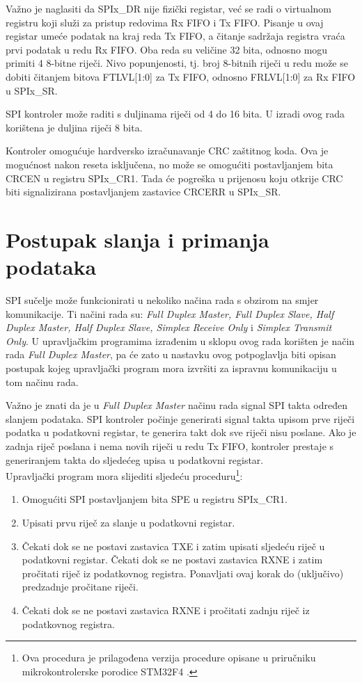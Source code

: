 		Važno je naglasiti da SPIx\_DR nije fizički registar, već se radi o virtualnom registru koji služi za pristup redovima Rx FIFO i Tx FIFO. Pisanje u ovaj registar umeće podatak na kraj reda Tx FIFO, a čitanje sadržaja registra vraća prvi podatak u redu Rx FIFO. Oba reda su veličine 32 bita, odnosno mogu primiti 4 8-bitne riječi. Nivo popunjenosti, tj. broj 8-bitnih riječi u redu može se dobiti čitanjem bitova FTLVL[1:0] za Tx FIFO, odnosno FRLVL[1:0] za Rx FIFO u SPIx\_SR. 
		
		SPI kontroler može raditi s duljinama riječi od 4 do 16 bita. U izradi ovog rada korištena je duljina riječi 8 bita.
		
		Kontroler omogućuje hardversko izračunavanje CRC zaštitnog koda. Ova je mogućnost nakon reseta isključena, no može se omogućiti postavljanjem bita CRCEN u registru SPIx\_CR1. Tada će pogreška u prijenosu koju otkrije CRC biti signalizirana postavljanjem zastavice CRCERR u SPIx\_SR.
		
	\section{Postupak slanja i primanja podataka}
		
		SPI sučelje može funkcionirati u nekoliko načina rada s obzirom na smjer komunikacije. Ti načini rada su: \textit{Full Duplex Master, Full Duplex Slave, Half Duplex Master, Half Duplex Slave, Simplex Receive Only} i \textit{Simplex Transmit Only}. U upravljačkim programima izrađenim u sklopu ovog rada korišten je način rada \textit{Full Duplex Master}, pa će zato u nastavku ovog potpoglavlja biti opisan postupak kojeg upravljački program mora izvršiti za ispravnu komunikaciju u tom načinu rada.
		
		Važno je znati da je u \textit{Full Duplex Master} načinu rada signal SPI takta određen slanjem podataka. SPI kontroler počinje generirati signal takta upisom prve riječi podatka u podatkovni registar, te generira takt dok sve riječi nisu poslane. Ako je zadnja riječ poslana i nema novih riječi u redu Tx FIFO, kontroler prestaje s generiranjem takta do sljedećeg upisa u podatkovni registar. \\
		
		Upravljački program mora slijediti sljedeću proceduru\footnote{Ova procedura je prilagođena verzija procedure opisane u priručniku mikrokontrolerske porodice STM32F4 \cite[str.~887]{stm32f4_manual}.}:
		\begin{enumerate}
			\item Omogućiti SPI postavljanjem bita SPE u registru SPIx\_CR1.
			\item Upisati prvu riječ za slanje u podatkovni registar.
			\item Čekati dok se ne postavi zastavica TXE i zatim upisati sljedeću riječ u podatkovni registar. Čekati dok se ne postavi zastavica RXNE i zatim pročitati riječ iz podatkovnog registra. Ponavljati ovaj korak do (uključivo) predzadnje pročitane riječi.
			\item  Čekati dok se ne postavi zastavica RXNE i pročitati zadnju riječ iz podatkovnog registra.
		\end{enumerate}
	
